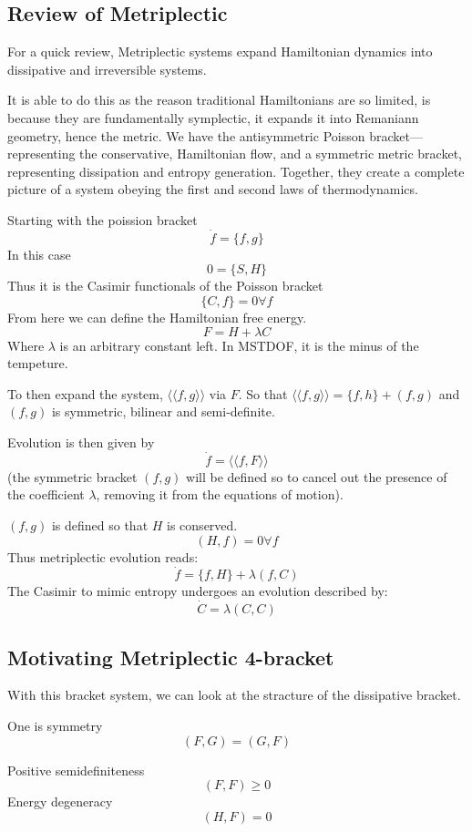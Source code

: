 \subsection{Review of Metriplectic}

For a quick review, Metriplectic systems expand Hamiltonian dynamics into dissipative and irreversible systems.

It is able to do this as the reason traditional Hamiltonians are so limited, is because they are fundamentally symplectic, it expands it into Remaniann geometry, hence the metric. We have the antisymmetric Poisson bracket—representing the conservative, Hamiltonian flow, and a symmetric metric bracket, representing dissipation and entropy generation. Together, they create a complete picture of a system obeying the first and second laws of thermodynamics.

Starting with the poission bracket
$$\dot{f}=\{f,g\}$$
In this case
$$0= \{S,H\}$$
Thus it is the Casimir functionals of the Poisson bracket
$$\{C,f\}=0 \forall f$$
From here we can define the Hamiltonian free energy.
$$F=H+\lambda C $$
Where $\lambda$ is an arbitrary constant left. In MSTDOF, it is the minus of the tempeture.

To then expand the system, $\langle\langle f,g \rangle \rangle$ via $F$. So that $\langle\langle f, g\rangle \rangle=\{f,h\} + (f,g)$ and $(f,g)$ is symmetric, bilinear and semi-definite.

Evolution is then given by
$$\dot{f}=\langle\langle f, F\rangle \rangle$$
(the symmetric bracket $(f,g)$ will be defined so to cancel out the presence of the coefficient
 $\lambda$, removing it from the equations of motion).

 $(f,g)$ is defined so that $H$ is conserved.
 $$(H, f) = 0 \forall f$$
 Thus metriplectic evolution reads:
 $$\dot{f}=\{f,H\}+\lambda(f,C)$$
 The Casimir to mimic entropy undergoes an evolution described by:
 $$\dot{C}=\lambda(C,C)$$


\subsection{Motivating Metriplectic 4-bracket}

With this bracket system, we can look at the stracture of the dissipative bracket.

One is symmetry
\[
(F,G) = (G,F)
\]

Positive semidefiniteness
\[
(F,F) \geq 0
  \]
  Energy degeneracy
\[
(H,F) = 0
\]

